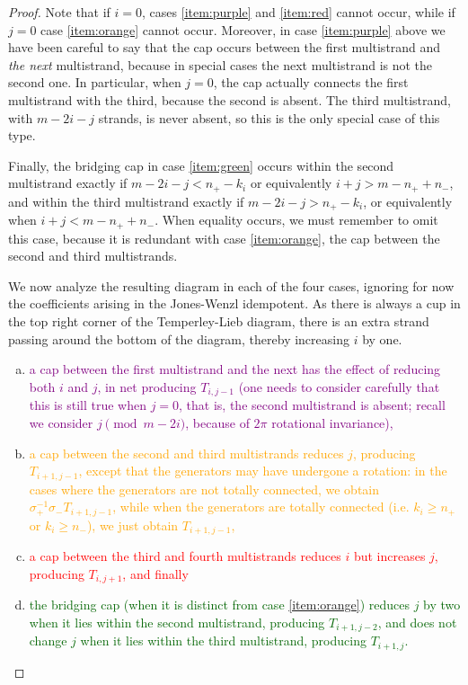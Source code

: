 \documentclass[12pt]{article}
\begin{document}
\begin{proof}
Note that if $i=0$, cases \eqref{item:purple} and \eqref{item:red} cannot occur, while if $j=0$ case \eqref{item:orange} cannot occur. Moreover, in case \eqref{item:purple} above we have been careful to say that the cap occurs between the first multistrand and \emph{the next} multistrand, because in special cases the next multistrand is not the second one. In particular, when $j=0$, the cap actually connects the first multistrand with the third, because the second is absent. The third multistrand, with $m-2i-j$ strands, is never absent, so this is the only special case of this type.

Finally, the bridging cap in case \eqref{item:green} occurs within the second multistrand exactly if $m-2i-j < n_+ - k_i$ or equivalently $i+j > m - n_+ + n_-$, and within the third multistrand exactly if $m-2i-j > n_+ - k_i$, or equivalently when $i+j < m - n_+ + n_-$. When equality occurs, we must remember to omit this case, because it is redundant with case \eqref{item:orange}, the cap between the second and third multistrands.

We now analyze the resulting diagram in each of the four cases, ignoring for now the coefficients arising in the Jones-Wenzl idempotent. As there is always a cup in the top right corner of the Temperley-Lieb diagram, there is an extra strand passing around the bottom of the diagram, thereby increasing $i$ by one.
\begin{enumerate}[(a)]
\item
\textcolor{purple}{
a cap between the first multistrand and the next has the effect of reducing both $i$ and $j$, in net producing $T_{i,j-1}$ (one needs to consider carefully that this is still true when $j=0$, that is, the second multistrand is absent; recall we consider $j \pmod{m-2i}$, because of $2\pi$ rotational invariance),
}
\item
\textcolor{orange}{
a cap between the second and third multistrands reduces $j$, producing $T_{i+1, j-1}$, except that the generators may have undergone a rotation: in the cases where the generators are not totally connected, we obtain $\sigma_+^{-1} \sigma_- T_{i+1, j-1}$, while when the generators are totally connected (i.e. $k_i \geq n_+$ or $k_i \geq   n_-$), we just obtain $T_{i+1,j-1}$,
}
\item
\textcolor{red}{
a cap between the third and fourth multistrands reduces $i$ but increases $j$, producing $T_{i, j+1}$, and finally
}
\item
\textcolor{DarkGreen}{
the bridging cap (when it is distinct from case \eqref{item:orange}) reduces $j$ by two when it lies within the second multistrand, producing $T_{i+1, j - 2}$, and does not change $j$ when it lies within the third multistrand, producing $T_{i+1, j}$. 
}
\end{enumerate}


\end{proof}
\end{document}
